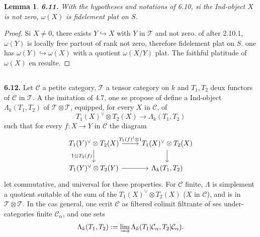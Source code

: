 \documentclass[12pt,a4paper]{article}
\theoremstyle{plain}
\newtheorem{lemma}[theorem]{Lemma}
\theoremstyle{definition}
\theoremstyle{remark}
\begin{document}
\begin{lemma}\label{lem:6.11}
\textbf{6.11.} With the hypotheses and notations of 6.10, si the Ind-object $X$ is not zero, $\omega(X)$ is fidelement plat on $S$.
\end{lemma}

\begin{proof}
Si $X \neq 0$, there exists $Y \hookrightarrow X$ with $Y$ in $\mathcal{T}$ and not zero. of after 2.10.1, $\omega(Y)$ is locally free partout of rank not zero, therefore fidelement plat on $S$. one has $\omega(Y) \hookrightarrow \omega(X)$ with a quotient $\omega(X/Y)$ plat. The faithful platitude of $\omega(X)$ en resulte.
\end{proof}

\subsection{}

\textbf{6.12.} Let $\mathcal{C}$ a petite category, $\mathcal{T}$ a tensor category on $k$ and $T_1, T_2$ deux functors of $\mathcal{C}$ in $\mathcal{T}$. A the imitation of 4.7, one se propose of define a Ind-object $\Lambda_k(T_1,T_2)$ of $\mathcal{T} \otimes \mathcal{T}$, equipped, for every $X$ in $\mathcal{C}$, of
\begin{equation}\label{eq:6.12.1}
T_1(X)^\vee \otimes T_2(X) \to \Lambda_k(T_1,T_2)
\end{equation}
such that for every $f : X \to Y$ in $\mathcal{C}$ the diagram
\begin{equation}\label{eq:6.12.2}
\begin{tikzcd}
T_1(Y)^\vee \otimes T_2(X) \arrow[r, "T_1(f)^t \otimes 1"] \arrow[d, "1 \otimes T_2(f)"'] & T_1(X)^\vee \otimes T_2(X) \arrow[d] \\
T_1(Y)^\vee \otimes T_2(Y) \arrow[r] & \Lambda_k(T_1,T_2)
\end{tikzcd}
\end{equation}
let commutative, and universal for these properties. For $\mathcal{C}$ finite, $\Lambda$ is simplement a quotient suitable of the sum of the $T_1(X)^\vee \otimes T_2(X)$ ($X$ in $\mathcal{C}$), and is in $\mathcal{T} \otimes \mathcal{T}$. In the cas general, one ecrit $\mathcal{C}$ as filtered colimit filtrante of ses under-categories finite $\mathcal{C}_\alpha$, and one sets
\[
\Lambda_k(T_1,T_2) := \varinjlim \Lambda_k(T_1|\mathcal{C}_\alpha, T_2|\mathcal{C}_\alpha).
\]
\end{document}
